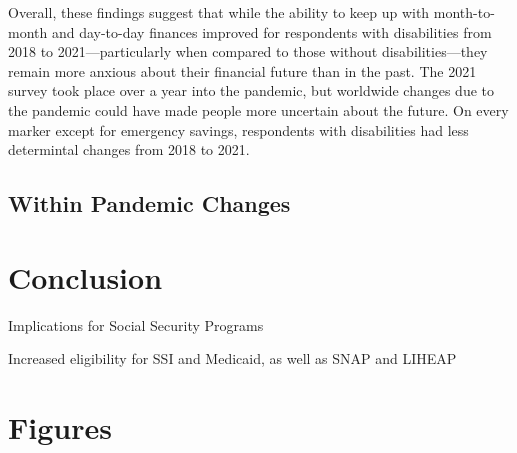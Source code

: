 \documentclass[12pt]{article}
\begin{document}
Overall, these findings suggest that while the ability to keep up with month-to-month and day-to-day finances improved for respondents with disabilities from 2018 to 2021---particularly when compared to those without disabilities---they remain more anxious about their financial future than in the past. The 2021 survey took place over a year into the pandemic, but worldwide changes due to the pandemic could have made people more uncertain about the future. On every marker except for emergency savings, respondents with disabilities had less determintal changes from 2018 to 2021. 


\subsection{Within Pandemic Changes}

 
  

\section{Conclusion}
 
Implications for Social Security Programs
 
Increased eligibility for SSI and Medicaid, as well as SNAP and LIHEAP
 

\section{Figures}
 
 
\end{document}
